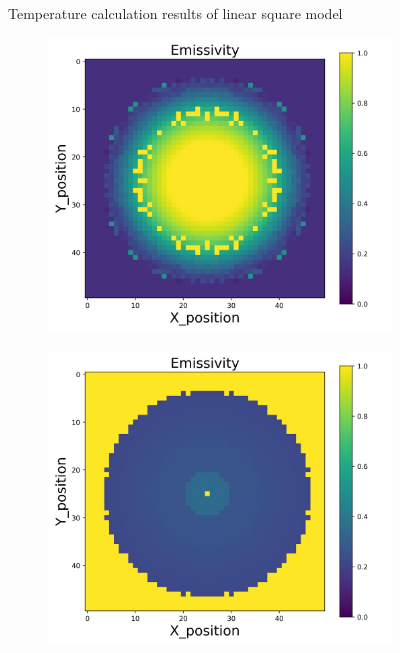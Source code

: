 {\begin{figure}[p]
\begin{minipage}{\textwidth}
\begin{subfigure}{0.325\textwidth}
        \end{subfigure}
    \end{minipage}
    \caption{Temperature calculation results of linear square model}  
\end{figure}
\begin{figure}[p]
    \centering
    \begin{minipage}{\textwidth}
        \centering
        \begin{subfigure}{0.325\textwidth}
            \centering
            \includegraphics[width=\textwidth]{figures/raw_data/0/lin_square/emi_cal.jpg}
        \end{subfigure}
        \begin{subfigure}{0.325\textwidth}
            \centering
            \includegraphics[width=\textwidth]{figures/raw_data/5/lin_square/emi_cal.jpg}

\end{subfigure}
\end{minipage}
\end{figure}}
